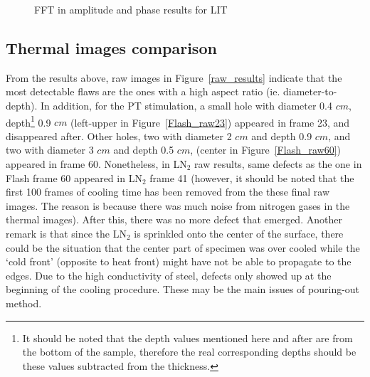 \begin{figure}[htpb]
   \centering
   \hspace{10pt}
   \hspace{10pt}
   \hspace{10pt}
   \hspace{10pt}
   \hspace{10pt}
   \caption{FFT in amplitude and phase results for LIT}      
   \label{LIT_results}
\end{figure}

\subsection{Thermal images comparison} 

From the results above, raw images in Figure~\ref{raw_results} indicate that the most detectable flaws are the ones with a high aspect ratio (ie. diameter-to-depth). In addition, for the PT stimulation, a small hole with diameter 0.4 $cm$, depth\footnote{It should be noted that the depth values mentioned here and after are from the bottom of the sample, therefore the real corresponding depths should be these values subtracted from the thickness.} 0.9 $cm$ (left-upper in Figure~\ref{Flash_raw23}) appeared in frame 23, and disappeared after. Other holes, two with diameter 2 $cm$ and depth 0.9 $cm$, and two with diameter 3 $cm$ and depth 0.5 $cm$, 
(center in Figure~\ref{Flash_raw60}) appeared in frame 60.  Nonetheless, in LN$_2$ raw results, same defects as the one in Flash frame 60 appeared in LN$_2$ frame 41 (however, it should be noted that the first 100 frames of cooling time has been removed from the these final raw images. The reason is because there was much noise from nitrogen gases in the thermal images).
After this, there was no more defect that emerged. Another remark is that since the LN$_2$ is sprinkled onto the center of the surface, there could be the situation that the center part of specimen was over cooled while the `cold front' (opposite to heat front) might have not be able to propagate to the edges. Due to the high conductivity of steel, defects only showed up at the beginning
of the cooling procedure. These may be the main issues of pouring-out method.

